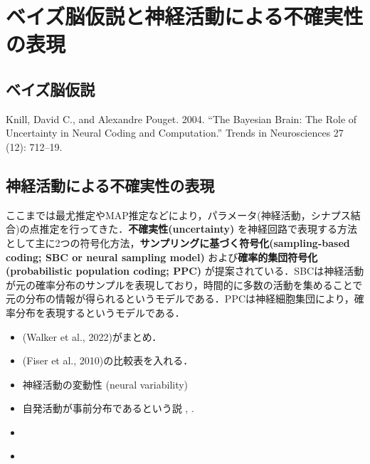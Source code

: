 \section{ベイズ脳仮説と神経活動による不確実性の表現}

\subsection{ベイズ脳仮説}
Knill, David C., and Alexandre Pouget. 2004. “The Bayesian Brain: The Role of Uncertainty in Neural Coding and Computation.” Trends in Neurosciences 27 (12): 712–19.

\subsection{神経活動による不確実性の表現}
ここまでは最尤推定やMAP推定などにより，パラメータ(神経活動，シナプス結合)の点推定を行ってきた．\textbf{不確実性(uncertainty)} を神経回路で表現する方法として主に2つの符号化方法，\textbf{サンプリングに基づく符号化(sampling-based coding; SBC or neural sampling model)} および\textbf{確率的集団符号化(probabilistic population coding; PPC)} が提案されている．SBCは神経活動が元の確率分布のサンプルを表現しており，時間的に多数の活動を集めることで元の分布の情報が得られるというモデルである．PPCは神経細胞集団により，確率分布を表現するというモデルである．

\begin{itemize}
\item (Walker et al., 2022)がまとめ．
\item (Fiser et al., 2010)の比較表を入れる．
\item 神経活動の変動性 (neural variability)
\item 自発活動が事前分布であるという説 \cite{Fiser2010-kw}, \cite{Berkes2011-it}.
\item \cite{Hoyer2002-ci}
\item \cite{Sanborn2016-en}
\end{itemize}





